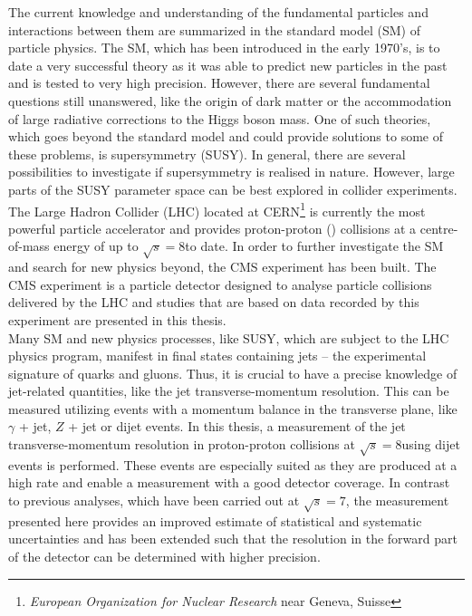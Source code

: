 The current knowledge and understanding of the fundamental particles and interactions between them are summarized in the standard model (SM) of particle physics. The SM, which has been introduced in the early 1970's, is to date a very successful theory as it was able to predict new particles in the past and is tested to very high precision. However, there are several fundamental questions still unanswered, like the origin of dark matter or the accommodation of large radiative corrections to the Higgs boson mass. One of such theories, which goes beyond the standard model and could provide solutions to some of these problems, is supersymmetry (SUSY). In general, there are several possibilities to investigate if supersymmetry is realised in nature. However, large parts of the SUSY parameter space can be best explored in collider experiments. \\
The Large Hadron Collider (LHC) located at CERN\footnote{\textit{European Organization for Nuclear Research} near Geneva, Suisse} is currently the most powerful particle accelerator and provides proton-proton (\pp) collisions at a centre-of-mass energy of up to $\sqrt{s} = 8$\tev to date. In order to further investigate the SM and search for new physics beyond, the CMS experiment has been built. The CMS experiment is a particle detector designed to analyse particle collisions delivered by the LHC and studies that are based on data recorded by this experiment are presented in this thesis. \\ 
Many SM and new physics processes, like SUSY, which are subject to the LHC physics program, manifest in final states containing jets -- the experimental signature of quarks and gluons. Thus, it is crucial to have a precise knowledge of jet-related quantities, like the jet transverse-momentum resolution. This can be measured utilizing events with a momentum balance in the transverse plane, like $\gamma$ + jet, $Z$ + jet or dijet events. In this thesis, a measurement of the jet transverse-momentum resolution in proton-proton collisions at $\sqrt{s} = 8$\tev using dijet events is performed. These events are especially suited as they are produced at a high rate and enable a measurement with a good detector coverage. In contrast to previous analyses, which have been carried out at $\sqrt{s} = 7$\tev, the measurement presented here provides an improved estimate of statistical and systematic uncertainties and has been extended such that the resolution in the forward part of the detector can be determined with higher precision. \\
